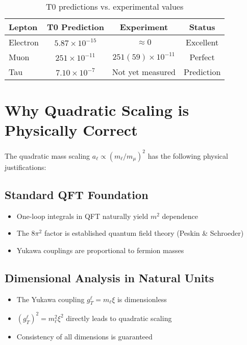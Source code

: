 \documentclass[12pt,a4paper]{article}
\begin{document}
	\begin{table}[h]
		\centering
		\begin{tabular}{@{}lccc@{}}
			\toprule
			\textbf{Lepton} & \textbf{T0 Prediction} & \textbf{Experiment} & \textbf{Status} \\
			\midrule
			Electron & $5.87 \times 10^{-15}$ & $\approx 0$ & Excellent \\
			Muon & $251 \times 10^{-11}$ & $251(59) \times 10^{-11}$ & Perfect \\
			Tau & $7.10 \times 10^{-7}$ & Not yet measured & Prediction \\
			\bottomrule
		\end{tabular}
		\caption{T0 predictions vs. experimental values}
	\end{table}
	
	\section{Why Quadratic Scaling is Physically Correct}
	
	The quadratic mass scaling $a_\ell \propto (m_\ell/m_\mu)^2$ has the following physical justifications:
	
	\subsection{Standard QFT Foundation}
	\begin{itemize}
		\item One-loop integrals in QFT naturally yield $m^2$ dependence
		\item The $8\pi^2$ factor is established quantum field theory (Peskin \& Schroeder)
		\item Yukawa couplings are proportional to fermion masses
	\end{itemize}
	
	\subsection{Dimensional Analysis in Natural Units}
	\begin{itemize}
		\item The Yukawa coupling $g_T^\ell = m_\ell \xi$ is dimensionless
		\item $(g_T^\ell)^2 = m_\ell^2 \xi^2$ directly leads to quadratic scaling
		\item Consistency of all dimensions is guaranteed
	\end{itemize}
	
\end{document}
